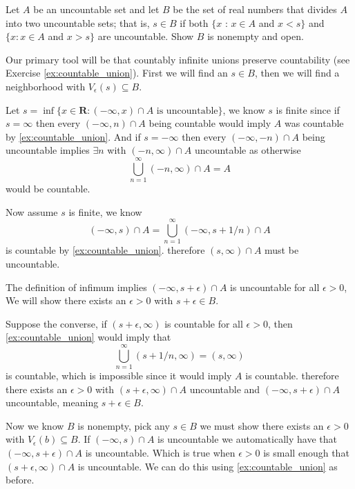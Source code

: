 \begin{exercise}
  Let $A$ be an uncountable set and let $B$ be the set of real numbers that divides $A$ into two uncountable sets; that is, $s \in B$ if both $\{x$ : $x \in A$ and $x<s\}$ and $\{x: x \in A$ and $x>s\}$ are uncountable. Show $B$ is nonempty and open.
\end{exercise}

\begin{solution}
  Our primary tool will be that countably infinite unions preserve countability (see Exercise \ref{ex:countable_union}). First we will find an $s \in B$, then we will find a neighborhood with $V_\epsilon(s) \subseteq B$.

  Let $s = \inf \{x \in \mathbf{R} : (-\infty, x) \cap A \text{ is uncountable}\}$, we know $s$ is finite since if $s = \infty$ then every $(-\infty, n) \cap A$ being countable would imply $A$ was countable by \ref{ex:countable_union}.
  And if $s = -\infty$ then every $(-\infty, -n) \cap A$ being uncountable implies $\exists n$ with $(-n, \infty) \cap A$ uncountable as otherwise
  $$
  \bigcup_{n=1}^\infty (-n, \infty) \cap A = A
  $$
  would be countable.

  Now assume $s$ is finite, we know
  $$(-\infty, s) \cap A = \bigcup_{n=1}^\infty (-\infty, s+1/n) \cap A$$
  is countable by \ref{ex:countable_union}. therefore $(s, \infty) \cap A$ must be uncountable.

  The definition of infimum implies $(-\infty, s+\epsilon) \cap A$ is uncountable for all $\epsilon > 0$, We will show there exists an $\epsilon > 0$ with $s+\epsilon \in B$.

  Suppose the converse, if $(s+\epsilon, \infty)$ is countable for all $\epsilon > 0$, then \ref{ex:countable_union} would imply that
  $$\bigcup_{n=1}^\infty (s+1/n, \infty) = (s, \infty)$$
  is countable, which is impossible since it would imply $A$ is countable. therefore there exists an $\epsilon > 0$ with $(s+\epsilon, \infty) \cap A$ uncountable and $(-\infty, s+\epsilon) \cap A$ uncountable, meaning $s+\epsilon \in B$.

  Now we know $B$ is nonempty, pick any $s \in B$ we must show there exists an $\epsilon > 0$ with $V_\epsilon(b) \subseteq B$. If $(-\infty, s) \cap A$ is uncountable we automatically have that $(-\infty, s+\epsilon) \cap A$ is uncountable. Which is true when $\epsilon > 0$ is small enough that $(s+\epsilon, \infty) \cap A$ is uncountable. We can do this using \ref{ex:countable_union} as before.
\end{solution}

